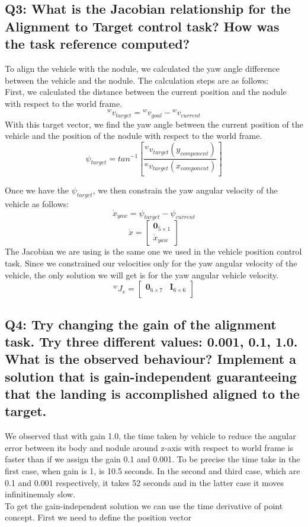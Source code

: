 \documentclass{article}
\begin{document}
\subsection{Q3: What is the Jacobian relationship for the Alignment to Target control task? How was the task reference computed?}
To align the vehicle with the nodule, we calculated the yaw angle difference between the vehicle and the nodule. The calculation steps are as follows:
\\ First, we calculated the distance between the current position and the nodule with respect to the world frame.
$${}^{w}v_{target} = {}^{w}v_{goal} - {}^{w}v_{current} $$  %
\noindent
With this target vector, we find the yaw angle between the current position of the vehicle and the position of the nodule with respect to the world frame. \\
$$\psi_{target} = tan^{-1}\left[\frac{{}^{w}v_{target}(y_{component})}{{}^{w}v_{target}(x_{component})}\right]$$ %

Once we have the $\psi_{target}$, we then constrain the yaw angular velocity of the vehicle as follows:
$$\dot{x}_{yaw}=\psi_{target}-\psi_{current}$$
$$\dot{x} = \begin{bmatrix}
		\mathbf{0}_{5 \times 1} \\ \dot{x}_{yaw}
		\end{bmatrix} $$
The Jacobian we are using is the same one we used in the vehicle position control task. Since we constrained our velocities only for the yaw angular velocity of the vehicle, the only solution we will get is for the yaw angular vehicle velocity. 
$${}^{w}J_v = \begin{bmatrix}
		\mathbf{0}_{6 \times 7} & \mathbf{I}_{6 \times 6} \\
		\end{bmatrix} $$
\subsection{Q4: Try changing the gain of the alignment task. Try three different values: 0.001, 0.1, 1.0. What is the observed behaviour? Implement a solution that is gain-independent guaranteeing that the landing is accomplished aligned to the target.}
We observed that with gain 1.0, the time taken by vehicle to reduce the angular error between its body and nodule around z-axis with respect to world frame is faster than if we assign the gain 0.1 and 0.001. To be precise the time take in the first case, when gain is 1, is 10.5 seconds. In the second and third case, which are 0.1 and 0.001 respectively, it takes 52 seconds and in the latter case it moves infinitinemaly slow. \\
To get the gain-independent solution we can use the time derivative of point concept. 
First we need to define the position vector \\
\end{document}
